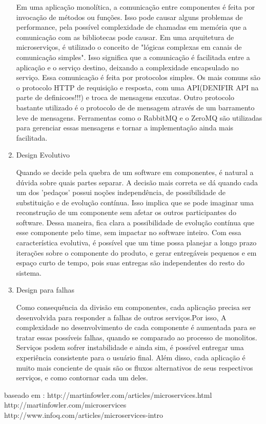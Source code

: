 \begin{enumerate}
Em uma aplicação monolítica, a comunicação entre componentes é feita por invocação de métodos ou funções. Isso pode causar alguns problemas de performance, pela possível complexidade de chamadas em memória que a comunicação com as bibliotecas pode causar.
Em uma arquitetura de microserviços, é utilizado o conceito de "lógicas complexas em canais de comunicação simples". Isso significa que a comunicação é facilitada entre a aplicação e o serviço destino, deixando a complexidade encapsulado no serviço.
Essa comunicação é feita por protocolos simples. Os mais comuns são o protocolo HTTP de requisição e resposta, com uma API(DENIFIR API na parte de definicoes!!!) e troca de mensagens enxutas.
Outro protocolo bastante utilizado é o protocolo de de mensagem através de um barramento leve de mensagens. Ferramentas como o RabbitMQ e o ZeroMQ são  utilizadas para gerenciar essas mensagens e tornar a implementação ainda mais facilitada.


\item Design Evolutivo

	Quando se decide pela quebra de um software em componentes, é natural a dúvida sobre quais partes separar. A decisão mais correta se dá quando cada um dos 'pedaços' possui noções independência, de possibilidade de substituição e de evolução contínua. 
Isso implica que se pode imaginar uma reconstrução de um componente sem afetar os outros participantes do software. Dessa maneira, fica clara a possibilidade de evolução contínua que esse componente pelo time, sem impactar no software inteiro. 
	Com essa característica evolutiva, é possível que um time possa planejar a longo prazo iterações sobre o componente do produto, e gerar entregáveis pequenos e em espaço curto de tempo, pois suas entregas são independentes do resto do sistema.

\item Design para falhas

	Como consequência da divisão em componentes, cada aplicação precisa ser desenvolvida para responder a falhas de outros serviços.Por isso, A complexidade no desenvolvimento de cada componente é aumentada para se tratar essas possíveis falhas, quando se comparado ao processo de monolitos. 
Serviços podem sofrer instabilidade e ainda sim, é possível entregar uma experiência consistente para o usuário final. Além disso, cada aplicação é muito mais conciente de quais são os fluxos alternativos de seus respectivos serviços, e como contornar cada um deles.

\end{enumerate}










baseado em  : http://martinfowler.com/articles/microservices.html
http://martinfowler.com/microservices
http://www.infoq.com/articles/microservices-intro


